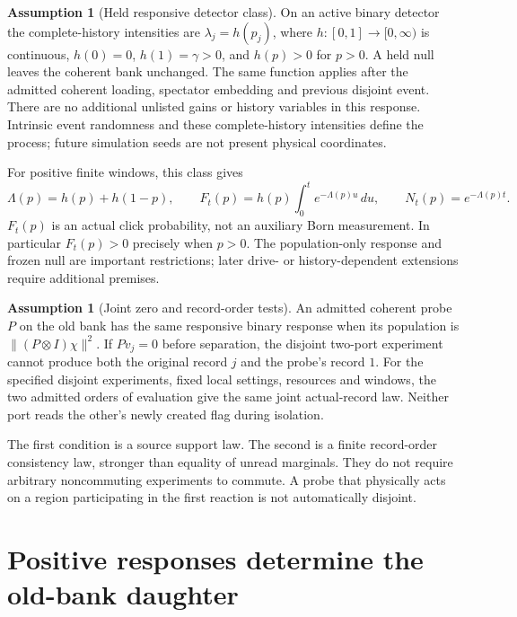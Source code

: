 \documentclass[11pt,oneside,openany]{book}
\theoremstyle{definition}
\newtheorem{assumption}[theorem]{Assumption}
\theoremstyle{remark}\newtheorem{remark}[theorem]{Remark}
\begin{document}
\begin{assumption}[Held responsive detector class]\label{det:held-assumptions}
On an active binary detector the complete-history intensities are
$\lambda_j=h(p_j)$, where $h:[0,1]\to[0,\infty)$ is continuous,
$h(0)=0$, $h(1)=\gamma>0$, and $h(p)>0$ for $p>0$. A held null leaves the
coherent bank unchanged. The same function applies after the admitted
coherent loading, spectator embedding and previous disjoint event.
There are no additional unlisted gains or history variables in this
response. Intrinsic event randomness and these complete-history
intensities define the process; future simulation seeds are not present
physical coordinates.
\end{assumption}

For positive finite windows, this class gives
\begin{equation}
 \Lambda(p)=h(p)+h(1-p),\qquad
 F_t(p)=h(p)\int_0^t e^{-\Lambda(p)u}\,du,
 \qquad N_t(p)=e^{-\Lambda(p)t}.                \label{det:held-laws}
\end{equation}
$F_t(p)$ is an actual click probability, not an auxiliary Born
measurement. In particular $F_t(p)>0$ precisely when $p>0$.
The population-only response and frozen null are important restrictions;
later drive- or history-dependent extensions require additional premises.

\begin{assumption}[Joint zero and record-order tests]\label{det:zero-assumptions}
An admitted coherent probe $P$ on the old bank has the same responsive
binary response when its population is $\|(P\otimes I)\chi\|^2$.
If $Pv_j=0$ before separation, the disjoint two-port experiment cannot
produce both the original record $j$ and the probe's record $1$.
For the specified disjoint experiments, fixed local settings, resources
and windows, the two admitted orders of evaluation give the same joint
actual-record law. Neither port reads the other's newly created flag
during isolation.
\end{assumption}

The first condition is a source support law. The second is a finite
record-order consistency law, stronger than equality of unread marginals.
They do not require arbitrary noncommuting experiments to commute. A
probe that physically acts on a region participating in the first
reaction is not automatically disjoint.

\section{Positive responses determine the old-bank daughter}
\end{document}
